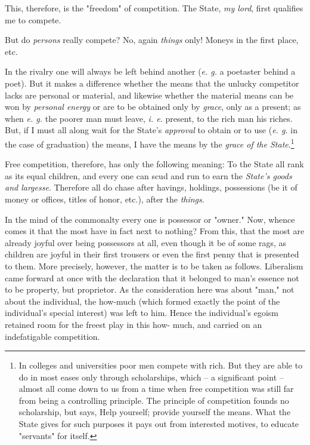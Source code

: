 This, therefore, is the "{}freedom"{} of competition. The State, \textit{my 
lord}, first qualifies me to compete.

But do \textit{persons} really compete? No, again \textit{things} only! Moneys 
in the first place, etc.

In the rivalry one will always be left behind another (\textit{e. g.} a 
poetaster behind a poet). But it makes a difference whether the means that the 
unlucky competitor lacks are personal or material, and likewise whether the 
material means can be won by \textit{personal energy} or are to be obtained 
only by \textit{grace}, only as a present; as when \textit{e. g.} the poorer 
man must leave, \textit{i. e.} present, to the rich man his riches. But, if I 
must all along wait for the State's \textit{approval} to obtain or to use 
(\textit{e. g.} in the case of graduation) the means, I have the means by the 
\textit{grace of the State}.\footnote{In colleges and universities poor men 
compete with rich. But they are able to do in most eases only through 
scholarships, which -- a significant point -- almost all come down to us from 
a time when free competition was still far from being a controlling principle. 
The principle of competition founds no scholarship, but says, Help yourself; 
provide yourself the means. What the State gives for such purposes it pays out 
from interested motives, to educate "{}servants"{} for itself.}

Free competition, therefore, has only the following meaning: To the State all 
rank as its equal children, and every one can scud and run to earn the 
\textit{State's goods and largesse}. Therefore all do chase after havings, 
holdings, possessions (be it of money or offices, titles of honor, etc.), 
after the \textit{things}.

In the mind of the commonalty every one is possessor or "{}owner."{} Now, 
whence comes it that the most have in fact next to nothing? From this, that 
the most are already joyful over being possessors at all, even though it be of 
some rags, as children are joyful in their first trousers or even the first 
penny that is presented to them. More precisely, however, the matter is to be 
taken as follows. Liberalism came forward at once with the declaration that it 
belonged to man's essence not to be property, but proprietor. As the 
consideration here was about "{}man,"{} not about the individual, the how-much 
(which formed exactly the point of the individual's special interest) was left 
to him. Hence the individual's egoism retained room for the freest play in 
this how- much, and carried on an indefatigable competition.

